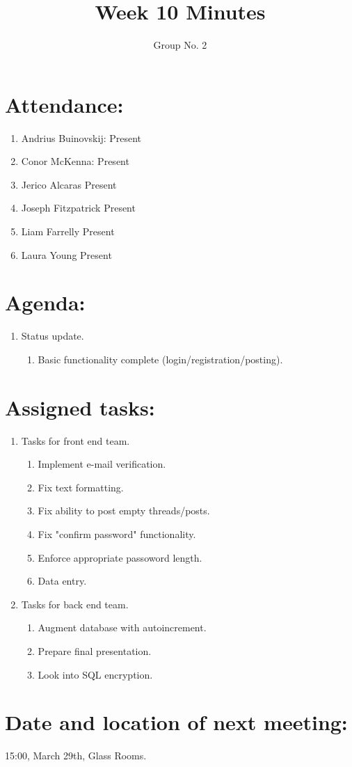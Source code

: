 \documentclass[a4paper, 12pt]{article}
\begin{document}
\title{Week 10 Minutes}
\author{Group No. 2}
\maketitle

	\section{Attendance:}
		\begin{enumerate}[label*=\arabic*.]
			\item Andrius Buinovskij:	\dotfill Present
			\item Conor McKenna:		\dotfill Present
			\item Jerico Alcaras		\dotfill Present
			\item Joseph Fitzpatrick	\dotfill Present
			\item Liam Farrelly		\dotfill Present
			\item Laura Young		\dotfill Present
		\end{enumerate}

	\section{Agenda:}
		\begin{enumerate}[label*=\arabic*.]
			\item Status update.
				\begin{enumerate}[label*=\arabic*.]
					\item Basic functionality complete (login/registration/posting).
				\end{enumerate}
		\end{enumerate}

	\newpage
	\section{Assigned tasks:}
		\begin{enumerate}[label*=\arabic*.]
			\item Tasks for front end team.
			\begin{enumerate}[label*=\arabic*.]
				\item Implement e-mail verification.
				\item Fix text formatting.
				\item Fix ability to post empty threads/posts.
				\item Fix "confirm password" functionality.
				\item Enforce appropriate passoword length.
				\item Data entry.
			\end{enumerate}
			\item Tasks for back end team.
			\begin{enumerate}[label*=\arabic*.]
				\item Augment database with autoincrement.
				\item Prepare final presentation.
				\item Look into SQL encryption.
			\end{enumerate}
		\end{enumerate}

	\section{Date and location of next meeting:}
		15:00, March 29th, Glass Rooms.
\end{document}
